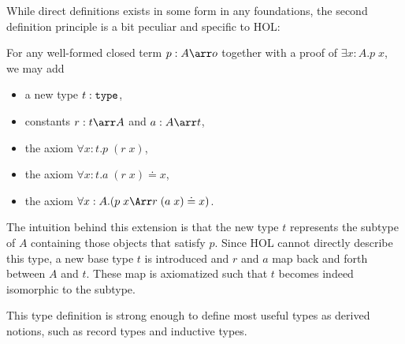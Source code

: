 While direct definitions exists in some form in any foundations, the second definition principle is a bit peculiar and specific to HOL:

\begin{definition}
For any well-formed closed term $p:A\arr o$ together with a proof of $\exists x:A.p\;x$, we may add
\begin{itemize}
 \item a new type $t:\mathtt{type}$,
 \item constants $r:t\arr A$ and $a:A\arr t$,
 \item the axiom $\forall x:t.p\;(r\;x)$,
 \item the axiom $\forall x:t.a\;(r\;x)\doteq x$,
 \item the axiom $\forall x:A.(p\;x \impl r\;(a\;x)\doteq x)$.
\end{itemize}
\end{definition}

The intuition behind this extension is that the new type $t$ represents the subtype of $A$ containing those objects that satisfy $p$. Since HOL cannot directly describe this type, a new base type $t$ is introduced and $r$ and $a$ map back and forth between $A$ and $t$. These map is axiomatized such that $t$ becomes indeed isomorphic to the subtype.

This type definition is strong enough to define most useful types as derived notions, such as record types and inductive types.